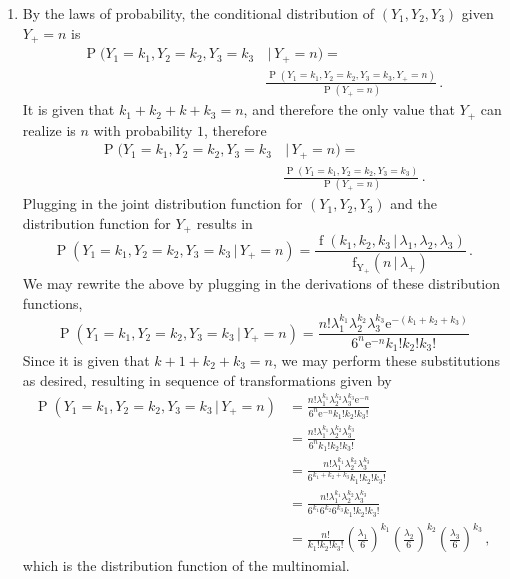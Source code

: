 \documentclass[12pt]{fphw}[final]
\begin{document}
\begin{enumerate}
	\item By the laws of probability, the conditional distribution of $(Y_1,Y_2,Y_3)$ given $Y_{+} = n$ is
	\begin{align}
		\operatorname{P}(Y_1 = k_1,Y_2 = k_2,Y_3 = k_3 &\,\vert\, Y_{+} = n) =\\
			&\frac{\operatorname{P}(Y_1 = k_1,Y_2 = k_2,Y_3 = k_3, Y_{+} = n)}{\operatorname{P}(Y_{+} = n)}\,.
	\end{align}
	It is given that $k_1+k_2+k+k_3 = n$, and therefore the only value that $Y_{+}$ can realize is $n$ with
	probability $1$, therefore
	\begin{align}
		\operatorname{P}(Y_1 = k_1,Y_2 = k_2,Y_3 = k_3 &\,\vert\, Y_{+} = n) =\\
		&\frac{\operatorname{P}(Y_1 = k_1,Y_2 = k_2,Y_3 = k_3)}{\operatorname{P}(Y_{+} = n)}\,.
	\end{align}
	Plugging in the joint distribution function for $(Y_1,Y_2,Y_3)$ and the distribution function for $Y_{+}$ results in
	\begin{equation}
		\operatorname{P}(Y_1 = k_1,Y_2 = k_2,Y_3 = k_3 \,\vert\, Y_{+} = n) =
            \frac{\operatorname{f}(k_1,k_2,k_3 \,\vert\, \lambda_1,\lambda_2,\lambda_3)}{\operatorname{f_{Y_{+}}}\!(n\,\vert\,\lambda_{+})}\,.
	\end{equation}	
	We may rewrite the above by plugging in the derivations of these distribution functions,
	\begin{equation}
        \operatorname{P}(Y_1 = k_1,Y_2 = k_2,Y_3 = k_3 \,\vert\, Y_{+} = n) = \frac{ n! \lambda_1^{k_1}\lambda_2^{k_2}\lambda_3^{k_3} \mathrm{e}^{-(k_1+k_2+k_3)}}{6^n \mathrm{e}^{-n} k_1! k_2! k_3!}
    \end{equation}	
    Since it is given that $k+1+k_2+k_3 = n$, we may perform these substitutions as desired, resulting in sequence of transformations given by
	\begin{align}
        \operatorname{P}(Y_1 = k_1,Y_2 = k_2,Y_3 = k_3 \,\vert\, Y_{+} = n)
            &= \frac{ n! \lambda_1^{k_1}\lambda_2^{k_2}\lambda_3^{k_3} \mathrm{e}^{-n}}{6^n \mathrm{e}^{-n} k_1! k_2! k_3!}\\
            &= \frac{ n! \lambda_1^{k_1}\lambda_2^{k_2}\lambda_3^{k_3}}{6^n k_1! k_2! k_3!}\\
            &= \frac{ n! \lambda_1^{k_1}\lambda_2^{k_2}\lambda_3^{k_3}}{6^{k_1+k_2+k_3} k_1! k_2! k_3!}\\
            &= \frac{ n! \lambda_1^{k_1}\lambda_2^{k_2}\lambda_3^{k_3}}{6^{k_1}6^{k_2}6^{k_3} k_1! k_2! k_3!}\\
            &= \frac{ n! }{k_1! k_2! k_3!}
                \!\left(\frac{\lambda_1}{6}\right)^{\!k_1}
                \!\!\left(\frac{\lambda_2}{6}\right)^{\!k_2}
                \!\!\left(\frac{\lambda_3}{6}\right)^{\!k_3}\,,
    \end{align}	
	which is the distribution function of the multinomial.
    

\end{enumerate}
\end{document}
